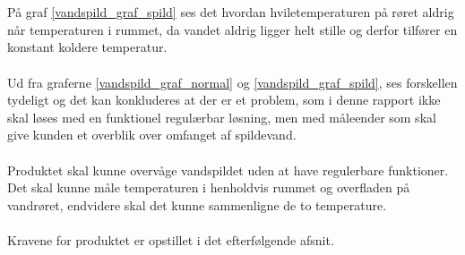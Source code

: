 \\
\\
På graf \ref{vandspild_graf_spild} ses det hvordan hviletemperaturen på røret aldrig når temperaturen i rummet, da vandet aldrig ligger helt stille og derfor tilfører en konstant koldere temperatur.
\\
\\
Ud fra graferne \ref{vandspild_graf_normal} og \ref{vandspild_graf_spild}, ses forskellen tydeligt og det kan konkluderes at der er et problem, som i denne rapport ikke skal løses med en funktionel regulærbar løsning, men med måleender som skal give kunden et overblik over omfanget af spildevand.
\\
\\
Produktet skal kunne overvåge vandspildet uden at have regulerbare funktioner. Det skal kunne måle temperaturen i henholdvis rummet og overfladen på vandrøret, endvidere skal det kunne sammenligne de to temperature.
\\
\\
Kravene for produktet er opstillet i det efterfølgende afsnit.     